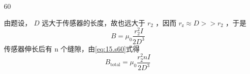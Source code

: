 \begin{solution}{60}
\begin{subsolution}
\begin{equation}
            \label{eq:14.s60}
        \end{equation}
        由题设， $D$ 远大于传感器的长度，故也远大于 $r_2$ ，因而 $r_{\mathrm{z}} \approx D >> r_{2}$ ，于是
        \begin{equation}
            B = \mu_{0} \frac {r _ {2}^{2} I}{2 D^{3}}
            \label{eq:15.s60}
        \end{equation}
        传感器伸长后有 n 个缝隙，由\eqref{eq:15.s60}式得
        \begin{equation}
            B _ {\mathrm{total}} = \mu_{0} \frac {r _ {2}^{2} n I}{2 D^{3}}
            \label{eq:16.s60}
        \end{equation}
    \end{subsolution}
\end{solution}